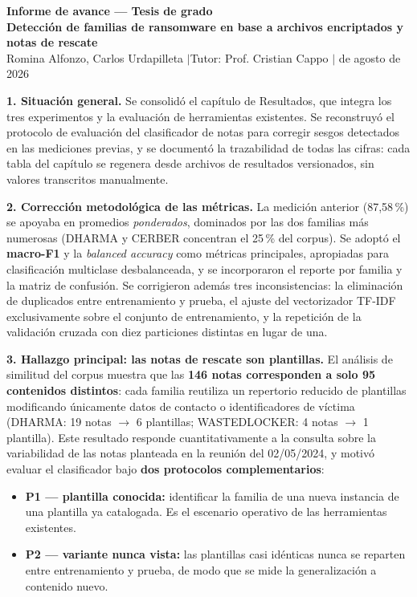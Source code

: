 \documentclass[11pt,a4paper]{article}
\begin{document}
{\large\textbf{Informe de avance --- Tesis de grado}}\\[2pt]
\textbf{Detección de familias de ransomware en base a archivos encriptados y notas de rescate}\\[2pt]
Romina Alfonzo, Carlos Urdapilleta \quad$\vert$\quad Tutor: Prof. Cristian Cappo \quad$\vert$ de agosto de 2026

\hrulefill

\textbf{1. Situación general.} Se consolidó el capítulo de Resultados, que integra los tres
experimentos y la evaluación de herramientas existentes. Se reconstruyó el protocolo de
evaluación del clasificador de notas para corregir sesgos detectados en las mediciones previas,
y se documentó la trazabilidad de todas las cifras: cada tabla del capítulo se regenera desde
archivos de resultados versionados, sin valores transcritos manualmente.

\textbf{2. Corrección metodológica de las métricas.} La medición anterior (87{,}58\,\%) se
apoyaba en promedios \emph{ponderados}, dominados por las dos familias más numerosas (DHARMA y
CERBER concentran el 25\,\% del corpus). Se adoptó el \textbf{macro-F1} y la \emph{balanced
accuracy} como métricas principales, apropiadas para clasificación multiclase desbalanceada, y
se incorporaron el reporte por familia y la matriz de confusión. Se corrigieron además tres
inconsistencias: la eliminación de duplicados entre entrenamiento y prueba, el ajuste del
vectorizador TF-IDF exclusivamente sobre el conjunto de entrenamiento, y la repetición de la
validación cruzada con diez particiones distintas en lugar de una.

\textbf{3. Hallazgo principal: las notas de rescate son plantillas.} El análisis de similitud
del corpus muestra que las \textbf{146 notas corresponden a solo 95 contenidos distintos}: cada
familia reutiliza un repertorio reducido de plantillas modificando únicamente datos de contacto
o identificadores de víctima (DHARMA: 19 notas $\rightarrow$ 6 plantillas; WASTEDLOCKER: 4 notas
$\rightarrow$ 1 plantilla). Este resultado responde cuantitativamente a la consulta sobre la
variabilidad de las notas planteada en la reunión del 02/05/2024, y motivó evaluar el
clasificador bajo \textbf{dos protocolos complementarios}:

\begin{itemize}
\item \textbf{P1 --- plantilla conocida:} identificar la familia de una nueva instancia de una
plantilla ya catalogada. Es el escenario operativo de las herramientas existentes.
\item \textbf{P2 --- variante nunca vista:} las plantillas casi idénticas nunca se reparten
entre entrenamiento y prueba, de modo que se mide la generalización a contenido nuevo.
\end{itemize}
\end{document}
